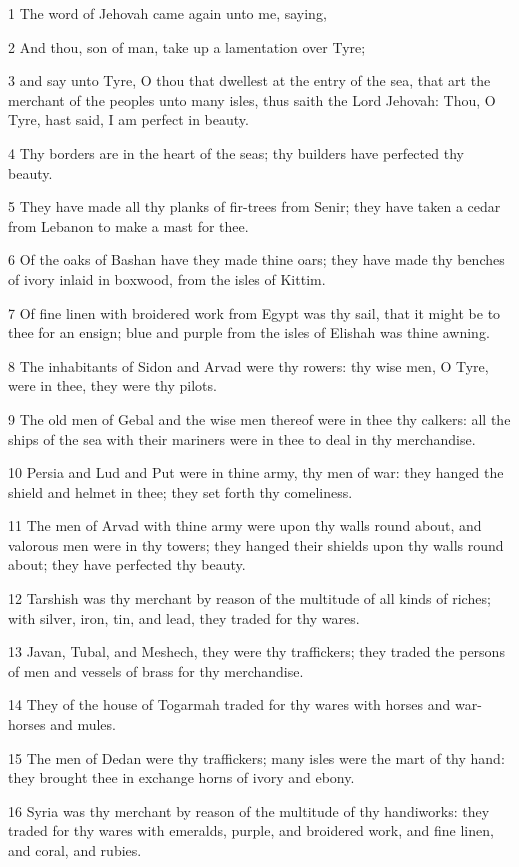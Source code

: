 \par 1 The word of Jehovah came again unto me, saying,
\par 2 And thou, son of man, take up a lamentation over Tyre;
\par 3 and say unto Tyre, O thou that dwellest at the entry of the sea, that art the merchant of the peoples unto many isles, thus saith the Lord Jehovah: Thou, O Tyre, hast said, I am perfect in beauty.
\par 4 Thy borders are in the heart of the seas; thy builders have perfected thy beauty.
\par 5 They have made all thy planks of fir-trees from Senir; they have taken a cedar from Lebanon to make a mast for thee.
\par 6 Of the oaks of Bashan have they made thine oars; they have made thy benches of ivory inlaid in boxwood, from the isles of Kittim.
\par 7 Of fine linen with broidered work from Egypt was thy sail, that it might be to thee for an ensign; blue and purple from the isles of Elishah was thine awning.
\par 8 The inhabitants of Sidon and Arvad were thy rowers: thy wise men, O Tyre, were in thee, they were thy pilots.
\par 9 The old men of Gebal and the wise men thereof were in thee thy calkers: all the ships of the sea with their mariners were in thee to deal in thy merchandise.
\par 10 Persia and Lud and Put were in thine army, thy men of war: they hanged the shield and helmet in thee; they set forth thy comeliness.
\par 11 The men of Arvad with thine army were upon thy walls round about, and valorous men were in thy towers; they hanged their shields upon thy walls round about; they have perfected thy beauty.
\par 12 Tarshish was thy merchant by reason of the multitude of all kinds of riches; with silver, iron, tin, and lead, they traded for thy wares.
\par 13 Javan, Tubal, and Meshech, they were thy traffickers; they traded the persons of men and vessels of brass for thy merchandise.
\par 14 They of the house of Togarmah traded for thy wares with horses and war-horses and mules.
\par 15 The men of Dedan were thy traffickers; many isles were the mart of thy hand: they brought thee in exchange horns of ivory and ebony.
\par 16 Syria was thy merchant by reason of the multitude of thy handiworks: they traded for thy wares with emeralds, purple, and broidered work, and fine linen, and coral, and rubies.
